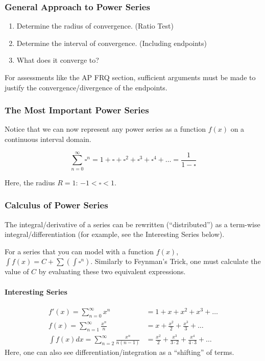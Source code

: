 \documentclass{article}
\begin{document}
\subsubsection{General Approach to Power Series}
\begin{enumerate}
    \item Determine the radius of convergence. (Ratio Test)
    \item Determine the interval of convergence. (Including endpoints)
    \item What does it converge to?
\end{enumerate}
For assessments like the AP FRQ section, sufficient arguments must be made to justify the convergence/divergence of the endpoints.

\subsubsection{The Most Important Power Series}
Notice that we can now represent any power series as a function $f(x)$ on a continuous interval domain.

$$\sum_{n=0}^{\infty} \square^n = 1 + \square + \square^2 + \square^3 + \square^4 + \ldots = \frac{1}{1-\square}$$

Here, the radius $R = 1$: $-1 < \square < 1$.

\subsubsection{Calculus of Power Series}
The integral/derivative of a series can be rewritten (``distributed'') as a term-wise integral/differentiation (for example, see the Interesting Series below).

For a series that you can model with a function $f(x)$, $\int f(x) = C + \sum \left(\int \square^n\right)$. Similarly to Feynman's Trick, one must calculate the value of $C$ by evaluating these two equivalent expressions.

\paragraph{Interesting Series}
\begin{align*}
    f'(x) = \sum_{n=0}^{\infty} x^n &= 1 + x + x^2 + x^3 + \ldots \\
    f(x) = \sum_{n=1}^{\infty} \frac{x^n}{n} &= x + \frac{x^2}{2} + \frac{x^3}{3} + \ldots \\
    \int f(x)dx = \sum_{n=2}^{\infty} \frac{x^n}{n(n-1)} &= \frac{x^2}{2} + \frac{x^3}{3 \cdot 2} + \frac{x^4}{4 \cdot 3} + \ldots
\end{align*}
Here, one can also see differentiation/integration as a ``shifting'' of terms.
\end{document}
